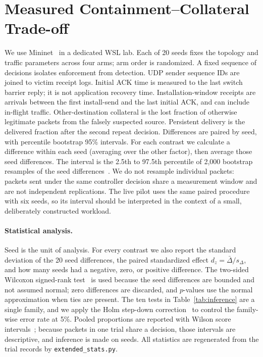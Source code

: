 \documentclass[conference]{IEEEtran}
\begin{document}
\section{Measured Containment--Collateral Trade-off}
We use Mininet~\cite{lantz2010mininet} in a dedicated WSL lab. Each of 20 seeds fixes the
topology and traffic parameters across four arms; arm order is randomized. A fixed sequence
of decisions isolates enforcement from detection. UDP sender sequence IDs are joined to
victim receipt logs. Initial ACK time is measured to the last switch barrier reply; it is
not application recovery time. Installation-window receipts are arrivals between the first
install-send and the last initial ACK, and can include in-flight traffic. Other-destination
collateral is the lost fraction of otherwise legitimate packets from the falsely suspected
source. Persistent delivery is the delivered fraction after the second repeat decision.
Differences are paired by seed, with percentile bootstrap 95\% intervals.
For each contrast we calculate a difference within each seed (averaging over
the other factor), then average those seed differences. The interval is
the 2.5th to 97.5th percentile of 2,000 bootstrap resamples of the seed
differences~\cite{efron1979bootstrap}. We do not resample individual packets:
packets sent under the same controller decision share a measurement window
and are not independent replications. The live pilot uses the same paired
procedure with six seeds, so its interval should be interpreted in the
context of a small, deliberately constructed workload.

\paragraph{Statistical analysis.}
Seed is the unit of analysis. For every contrast we also report the standard
deviation of the 20 seed differences, the paired standardized effect
$d_z=\bar{\Delta}/s_\Delta$, and how many seeds had a negative, zero, or
positive difference. The two-sided Wilcoxon signed-rank test~\cite{wilcoxon1945individual}
is used because the seed differences are bounded and not assumed normal; zero
differences are discarded, and $p$-values use the normal approximation when
ties are present. The ten tests in Table~\ref{tab:inference} are a single family,
and we apply the Holm step-down correction~\cite{holm1979simple} to control the
family-wise error rate at 5\%. Pooled proportions are reported with Wilson score
intervals~\cite{wilson1927probable}; because packets in one trial share a decision,
those intervals are descriptive, and inference is made on seeds. All statistics are
regenerated from the trial records by \texttt{extended\_stats.py}.
\end{document}
